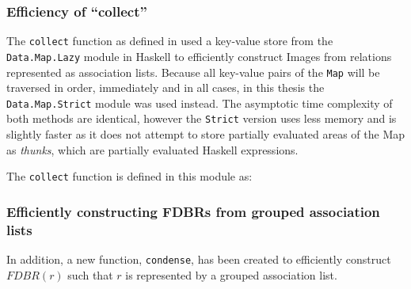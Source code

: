 \documentclass[../main.tex]{subfiles}
\begin{document}
\subsubsection{Efficiency of ``collect''}

The \texttt{collect} function as defined in \cite{agboola2015extensible} used a key-value store from the \texttt{Data.Map.Lazy} module in Haskell to efficiently construct Images from relations represented as association lists.  Because all key-value pairs of the \texttt{Map} will be traversed in order, immediately and in all cases, in this thesis the \texttt{Data.Map.Strict} module was used instead.  The asymptotic time complexity of both methods are identical, however the \texttt{Strict} version uses less memory and is slightly faster as it does not attempt to store partially evaluated areas of the Map as {\em thunks}, which are partially evaluated Haskell expressions.

The \texttt{collect} function is defined in this module as:







\subsubsection{Efficiently constructing FDBRs from grouped association lists}
In addition, a new function, \texttt{condense}, has been created to efficiently construct $FDBR(r)$ such that $r$ is represented by a grouped association list.
\end{document}
